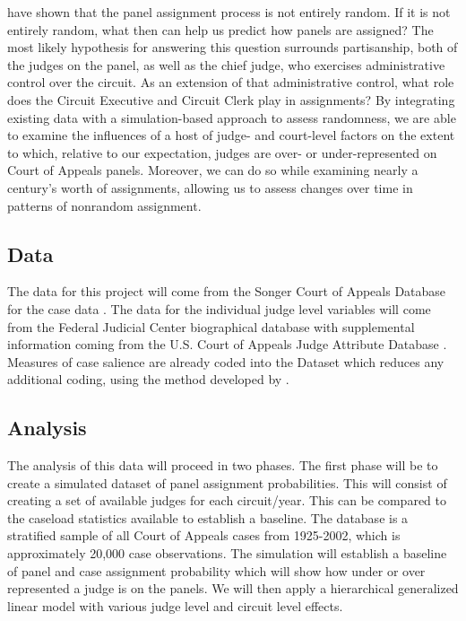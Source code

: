 \documentclass[12pt]{article}
\begin{document}
\citet{Chilton2014} have shown that the panel assignment process is not entirely random.  If it is not entirely random, what then can help us predict how panels are assigned?  The most likely hypothesis for answering this question surrounds partisanship, both of the judges on the panel, as well as the chief judge, who exercises administrative control over the circuit.  As an extension of that administrative control, what role does the Circuit Executive and Circuit Clerk play in assignments?  By integrating existing data with a simulation-based approach to assess randomness, we are able to examine the influences of a host of judge- and court-level factors on the extent to which, relative to our expectation, judges are over- or under-represented on Court of Appeals panels. Moreover, we can do so while examining nearly a century's worth of assignments, allowing us to assess changes over time in patterns of nonrandom assignment.

\subsection*{Data}
The data for this project will come from the Songer Court of Appeals Database for the case data \citep{Songer2007}.  The data for the individual judge level variables will come from the Federal Judicial Center biographical database with supplemental information coming from the U.S. Court of Appeals Judge Attribute Database \citep{FJC,Gryski2008}.  Measures of case salience are already coded into the \citeauthor{Songer2007} Dataset which reduces any additional coding, using the method developed by \citet{Hettinger2003}.

\subsection*{Analysis}
The analysis of this data will proceed in two phases.  The first phase will be to create a simulated dataset of panel assignment probabilities.  This will consist of creating a set of available judges for each circuit/year.  This can be compared to the caseload statistics available to establish a baseline.  The \citeauthor{Songer2007} database is a stratified sample of all Court of Appeals cases from 1925-2002, which is approximately 20,000 case observations.  The simulation will establish a baseline of panel and case assignment probability which will show how under or over represented a judge is on the panels.  We will then apply a hierarchical generalized linear model with various judge level and circuit level effects.  
\end{document}
